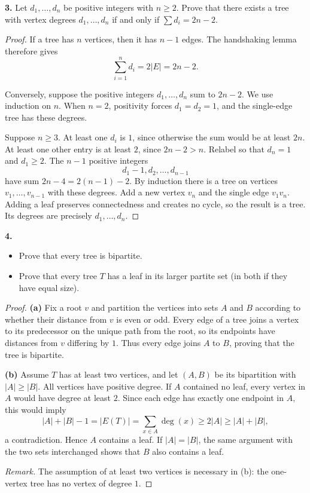 \documentclass[12pt]{amsart}
\theoremstyle{conjecture}
\theoremstyle{definition}
\theoremstyle{question}
\theoremstyle{theorem}
\begin{document}
    \noindent\textbf{3.} Let $d_1,\ldots, d_n$ be positive integers with $n\ge 2$.
    Prove that there exists a tree with vertex degrees $d_1,\ldots,d_n$ if and only if
    $\sum d_i = 2n - 2$.

    \begin{proof}
        If a tree has $n$ vertices, then it has $n-1$ edges.  The handshaking
        lemma therefore gives
        \[
            \sum_{i=1}^{n}d_i=2|E|=2n-2.
        \]

        Conversely, suppose the positive integers $d_1,\ldots,d_n$ sum to
        $2n-2$.  We use induction on $n$.  When $n=2$, positivity forces
        $d_1=d_2=1$, and the single-edge tree has these degrees.

        Suppose $n\ge3$.  At least one $d_i$ is $1$, since otherwise the
        sum would be at least $2n$.  At least one other entry is at least
        $2$, since $2n-2>n$.  Relabel so that $d_n=1$ and $d_1\ge2$.
        The $n-1$ positive integers
        \[
            d_1-1,d_2,\ldots,d_{n-1}
        \]
        have sum $2n-4=2(n-1)-2$.  By induction there is a tree on vertices
        $v_1,\ldots,v_{n-1}$ with these degrees.  Add a new vertex $v_n$
        and the single edge $v_1v_n$.  Adding a leaf preserves connectedness
        and creates no cycle, so the result is a tree.  Its degrees are
        precisely $d_1,\ldots,d_n$.
    \end{proof}

    \noindent\textbf{4.}
    \begin{itemize}
        \item[(a)] Prove that every tree is bipartite.
        \item[(b)] Prove that every tree $T$ has a leaf in its larger partite set (in both if they
        have equal size).
    \end{itemize}

    \begin{proof}
        \textbf{(a)} Fix a root $v$ and partition the vertices into sets
        $A$ and $B$ according to whether their distance from $v$ is even
        or odd.  Every edge of a tree joins a vertex to its predecessor
        on the unique path from the root, so its endpoints have distances
        from $v$ differing by $1$.  Thus every edge joins $A$ to $B$,
        proving that the tree is bipartite.

        \medskip
        \noindent\textbf{(b)} Assume $T$ has at least two vertices, and let
        $(A,B)$ be its bipartition with $|A|\ge|B|$.  All vertices have
        positive degree.  If $A$ contained no leaf, every vertex in $A$
        would have degree at least $2$.  Since each edge has exactly one
        endpoint in $A$, this would imply
        \[
            |A|+|B|-1=|E(T)|
            =\sum_{x\in A}\deg(x)
            \ge2|A|\ge|A|+|B|,
        \]
        a contradiction.  Hence $A$ contains a leaf.  If $|A|=|B|$,
        the same argument with the two sets interchanged shows that $B$
        also contains a leaf.

        \medskip
        \noindent\emph{Remark.} The assumption of at least two vertices
        is necessary in (b): the one-vertex tree has no vertex of degree $1$.
    \end{proof}
\end{document}

